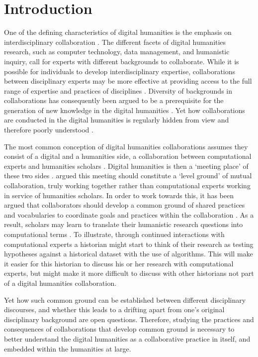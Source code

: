 \documentclass{article}
\begin{document}
\section{Introduction}
One of the defining characteristics of digital humanities is the emphasis on interdisciplinary collaboration \citep{Klein2014b,spiro2012}. The different facets of digital humanities research, such as computer technology, data management, and humanistic inquiry, call for experts with different backgrounds to collaborate.
While it is possible for individuals to develop interdisciplinary expertise, collaborations between disciplinary experts may be more effective at providing access to the full range of expertise and practices of disciplines \citep{stokols2006, wilson1996, Siemens2011}.
Diversity of backgrounds in collaborations has consequently been argued to be a prerequisite for the generation of new knowledge in the digital humanities \citep{edmond2016}. 
Yet how collaborations are conducted in the digital humanities is regularly hidden from view and therefore poorly understood \citep{griffin2018}.

The most common conception of digital humanities collaborations assumes they consist of a digital and a humanities side, a collaboration between computational experts and humanities scholars \citep{edmond2005}. 
Digital humanities is then a `meeting place' of these two sides \citep{svensson2011}.
\citet{mccarty2012a} argued this meeting should constitute a `level ground' of mutual collaboration, truly working together rather than computational experts working in service of humanities scholars.
In order to work towards this, it has been argued that collaborators should develop a common ground of shared practices and vocabularies to coordinate goals and practices within the collaboration \citep{Siemens2009,siemens2012human}.
As a result, scholars may learn to translate their humanistic research questions into computational terms \citep{mccarty2012a}.
To illustrate, through continued interactions with computational experts a historian might start to think of their research as testing hypotheses against a historical dataset with the use of algorithms. This will make it easier for this historian to discuss his or her research with computational experts, but might make it more difficult to discuss with other historians not part of a digital humanities collaboration.

Yet how such common ground can be established between different disciplinary discourses, and whether this leads to a drifting apart from one's original disciplinary background are open questions.
Therefore, studying the practices and consequences of collaborations that develop common ground is necessary to better understand the digital humanities as a collaborative practice in itself, and embedded within the humanities at large.
\end{document}

